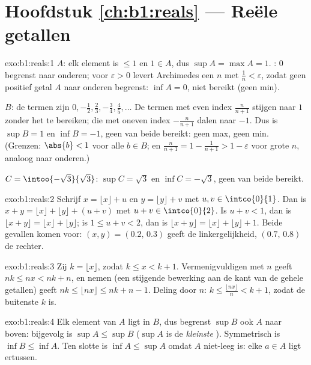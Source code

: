 \section*{Hoofdstuk \ref{ch:b1:reals} --- Reële getallen}

\begin{solution}{exo:b1:reals:1}
$A$: elk element is $\leq 1$ en $1 \in A$, dus $\sup A = \max A = 1$.
: $0$ begrenst naar onderen; voor $\varepsilon > 0$ levert
Archimedes een $n$ met $\frac 1n < \varepsilon$, zodat geen positief
getal $A$ naar onderen begrenst: $\inf A = 0$, niet bereikt (geen min).

$B$: de termen zijn $0, -\frac12, \frac23, -\frac34, \frac45, \dots$ De
termen met even index $\frac{n}{n+1}$ stijgen naar $1$ zonder het te
bereiken; die met oneven index $-\frac{n}{n+1}$ dalen naar $-1$. Dus is
$\sup B = 1$ en $\inf B = -1$, geen van beide bereikt: geen max, geen
min. (Grenzen: $\abs{b} < 1$ voor alle $b \in B$; en $\frac{n}{n+1} = 1 -
\frac{1}{n+1} > 1 - \varepsilon$ voor grote $n$, analoog naar onderen.)

$C = \intoo{-\sqrt 3}{\sqrt 3}$: $\sup C = \sqrt 3$ en $\inf C = -\sqrt
3$, geen van beide bereikt.
\end{solution}

\begin{solution}{exo:b1:reals:2}
Schrijf $x = \lfloor x \rfloor + u$ en $y = \lfloor y \rfloor + v$ met
$u, v \in \intco{0}{1}$. Dan is $x + y = \lfloor x \rfloor + \lfloor y
\rfloor + (u + v)$ met $u + v \in \intco{0}{2}$. Is $u + v < 1$, dan is
$\lfloor x + y\rfloor = \lfloor x\rfloor + \lfloor y \rfloor$; is $1 \leq
u + v < 2$, dan is $\lfloor x+y \rfloor = \lfloor x \rfloor + \lfloor y
\rfloor + 1$. Beide gevallen komen voor: $(x, y) = (0.2,\, 0.3)$ geeft de
linkergelijkheid, $(0.7,\, 0.8)$ de rechter.
\end{solution}

\begin{solution}{exo:b1:reals:3}
Zij $k = \lfloor x \rfloor$, zodat $k \leq x < k + 1$. Vermenigvuldigen
met $n$ geeft $nk \leq nx < nk + n$, en  nemen (een stijgende
bewerking aan de kant van de gehele getallen) geeft $nk \leq \lfloor nx
\rfloor \leq nk + n - 1$. Deling door $n$: $k \leq \frac{\lfloor nx
\rfloor}{n} < k + 1$, zodat de buitenste  $k$ is.
\end{solution}

\begin{solution}{exo:b1:reals:4}
Elk element van $A$ ligt in $B$, dus begrenst $\sup B$ ook $A$ naar
boven: bijgevolg is $\sup A \leq \sup B$ ($\sup A$ is de
\emph{kleinste} ). Symmetrisch is $\inf B \leq \inf A$. Ten
slotte is $\inf A \leq \sup A$ omdat $A$ niet-leeg is: elke $a \in A$
ligt ertussen.
\end{solution}


